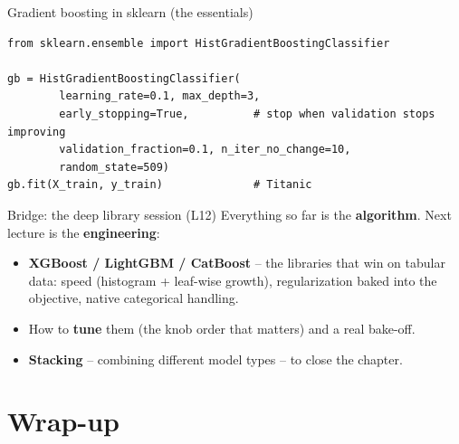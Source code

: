 \documentclass[aspectratio=169]{beamer}
\begin{document}
\begin{frame}[fragile]{Gradient boosting in sklearn (the essentials)}
\begin{lstlisting}
from sklearn.ensemble import HistGradientBoostingClassifier

gb = HistGradientBoostingClassifier(
        learning_rate=0.1, max_depth=3,
        early_stopping=True,          # stop when validation stops improving
        validation_fraction=0.1, n_iter_no_change=10,
        random_state=509)
gb.fit(X_train, y_train)              # Titanic
\end{lstlisting}
  \vfill
\end{frame}

\begin{frame}{Bridge: the deep library session (L12)}
  Everything so far is the \textbf{algorithm}. Next lecture is the \textbf{engineering}:
  \begin{itemize}\small
    \item \textbf{XGBoost / LightGBM / CatBoost} -- the libraries that win on tabular data:
      speed (histogram + leaf-wise growth), regularization baked into the objective,
      native categorical handling.
    \item How to \textbf{tune} them (the knob order that matters) and a real bake-off.
    \item \textbf{Stacking} -- combining different model types -- to close the chapter.
  \end{itemize}
  \vfill
\end{frame}

\section*{Wrap-up}
\end{document}
